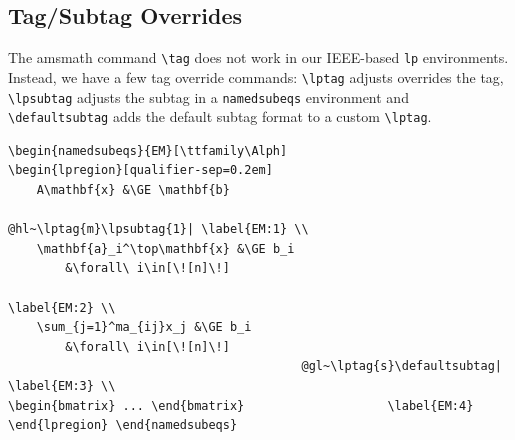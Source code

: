 \documentclass{article}
\begin{document}
\subsection*{Tag/Subtag Overrides}
The \textsf{amsmath} command \verb|\tag| does not work in our \textsf{IEEE}-based \verb|lp| environments. Instead, we have a few tag override commands: \verb|\lptag| adjusts overrides the tag, \verb|\lpsubtag| adjusts the subtag in a \verb|namedsubeqs| environment and \verb|\defaultsubtag| adds the default subtag format to a custom \verb|\lptag|.
	\begin{tcolorbox}
	\begin{Verbatim}
\begin{namedsubeqs}{EM}[\ttfamily\Alph]
\begin{lpregion}[qualifier-sep=0.2em]
	A\mathbf{x} &\GE \mathbf{b} 
											 @hl~\lptag{m}\lpsubtag{1}| \label{EM:1} \\
	\mathbf{a}_i^\top\mathbf{x} &\GE b_i 
		&\forall\ i\in[\![n]\!] 
																						 \label{EM:2} \\
	\sum_{j=1}^ma_{ij}x_j &\GE b_i 
		&\forall\ i\in[\![n]\!] 
										 @gl~\lptag{s}\defaultsubtag| \label{EM:3} \\
\begin{bmatrix} ... \end{bmatrix} 					 \label{EM:4}
\end{lpregion} \end{namedsubeqs}


\end{Verbatim}
\end{tcolorbox}
\end{document}

